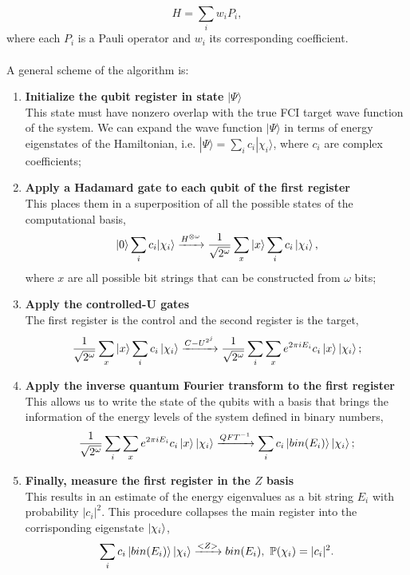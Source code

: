 \begin{equation}
    H = \sum_i w_i P_i,
\end{equation}
where each $P_i$ is a Pauli operator and $w_i$ its corresponding coefficient. \\
\\
A general scheme of the algorithm is:
\begin{enumerate}
    \item \textbf{Initialize the qubit register in state} $|\Psi\rangle$ \\
    This state must have nonzero overlap with the true FCI target wave function of the system. We can expand the wave function $|\Psi\rangle$ in terms of energy eigenstates of the Hamiltonian, i.e. $|\Psi\rangle = \sum_i c_i |\chi_i\rangle$, where $c_i$ are complex coefficients;
    
    \item \textbf{Apply a Hadamard gate to each qubit of the first register} \\
    This places them in a superposition of all the possible states of the computational basis,
    \begin{equation}
        |0\rangle \sum_i c_i |\chi_i\rangle \xrightarrow{H^{\otimes \omega}} \frac{1}{\sqrt{2^\omega}} \sum_x \ket{x} \sum_i c_i \ket{\chi_i},
    \end{equation}
    where $x$ are all possible bit strings that can be constructed from $\omega$ bits;
    
    \item \textbf{Apply the controlled-U gates} \\
    The first register is the control and the second register is the target,
    \begin{equation}
        \frac{1}{\sqrt{2^\omega}} \sum_x \ket{x} \sum_i c_i \ket{\chi_i} \xrightarrow{C-U^{2^j}} \frac{1}{\sqrt{2^\omega}} \sum_i \sum_x e^{2\pi i E_i} c_i \ket{x} \ket{\chi_i};
    \end{equation}
    
    \item \textbf{Apply the inverse quantum Fourier transform to the first register} \\
    This allows us to write the state of the qubits with a basis that brings the information of the energy levels of the system defined in binary numbers,
    \begin{equation}
        \frac{1}{\sqrt{2^\omega}} \sum_i \sum_x e^{2\pi i E_i} c_i \ket{x} \ket{\chi_i} \xrightarrow{QFT^{-1}} \sum_i c_i \ket{bin(E_i)} \ket{\chi_i};
    \end{equation}
    
    \item \textbf{Finally, measure the first register in the $Z$ basis} \\
    This results in an estimate of the energy eigenvalues as a bit string $E_i$ with probability $|c_i|^2$. This procedure collapses the main register into the corrisponding eigenstate $\ket{\chi_i}$,
    \begin{equation}
        \sum_i c_i \ket{bin(E_i)} \ket{\chi_i} \xrightarrow{<Z>} bin(E_i), \ \mathbb{P}(\chi_i) = |c_i|^2.
    \end{equation}
\end{enumerate}
